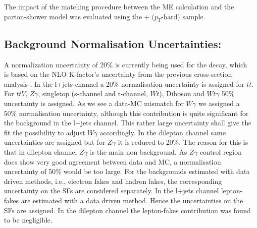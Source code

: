 The impact of the matching procedure between the ME calculation and the parton-shower model was evaluated using the \powheg + \pythia{} ($p_T$-hard) sample.



\subsection*{Background Normalisation Uncertainties:}
\label{sec:bkg_norm}

A normalization uncertainty of 20\% is currently being used for the \tty decay, which  is based on the NLO K-factor’s uncertainty from the previous \tty cross-section analysis \cite{Batool:2266485}. In the l+jets channel a 20\% normalisation uncertainty is assigned for $t\bar{t}$. For $t\bar{t}V$, $Z\gamma$, singletop  (s-channel and t-channel, $Wt$), Diboson and $Wt\gamma$ 50\% uncertainty is assigned. As we see a data-MC mismatch for $W\gamma$ we assigned a 50\% normalisation uncertainty, although this contribution is quite significant for the background in the l+jets channel. This rather large uncertainty shall give the fit the possibility to adjust $W\gamma$ accordingly. In the dilepton channel same uncertainties are assigned but for $Z\gamma$ it is reduced to 20\%. The reason for this is that in dilepton channel $Z\gamma$ is the main non \tty background. As $Z\gamma$ control region does show very good agreement between data and MC, a normalisation uncertainty of 50\% would be too large. For the backgrounds estimated with data driven methods, i.e., electron fakes and hadron fakes, the corresponding uncertainty on the SFs are considered separately. In the l+jets channel lepton-fakes are estimated with a data driven method. Hence the uncertainties on the SFs are assigned. In the dilepton channel the lepton-fakes contribution was found to be negligible.



